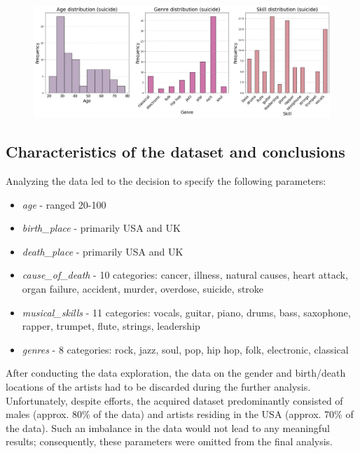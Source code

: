 \documentclass{article}
\begin{document}
\begin{figure}[H]
    \centering
    \includegraphics[width=1\linewidth]{graph_images/death_cause_analysis/suicide_distribution.png}
    \label{fig:enter-label}
\end{figure}



\subsection{Characteristics of the dataset and conclusions}

Analyzing the data led to the decision to specify the following parameters:
\begin{itemize}
    \item {\textit{age}} - ranged 20-100
    \item {\textit{birth\_place}} - primarily USA and UK
    \item {\textit{death\_place}} - primarily USA and UK
    \item {\textit{cause\_of\_death}} - 10 categories: cancer, illness, natural causes, heart attack, organ failure, accident, murder, overdose, suicide, stroke
    \item {\textit{musical\_skills}} - 11 categories: vocals, guitar, piano, drums, bass, saxophone, rapper, trumpet, flute, strings, leadership
    \item {\textit{genres}} - 8 categories: rock, jazz, soul, pop, hip hop, folk, electronic, classical
\end{itemize}

After conducting the data exploration, the data on the gender and birth/death locations of the artists had to be discarded during the further analysis. Unfortunately, despite efforts, the acquired dataset predominantly consisted of males (approx. 80\% of the data) and artists residing in the USA (approx. 70\% of the data). Such an imbalance in the data would not lead to any meaningful results; consequently, these parameters were omitted from the final analysis.
\end{document}
